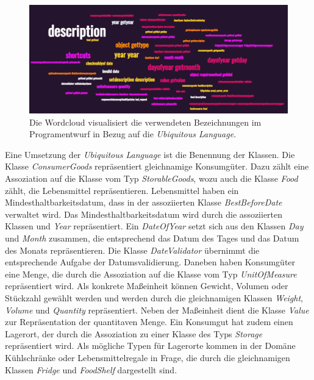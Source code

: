 \begin{figure}[H]
	\centering
	\includegraphics[width=1.0\textwidth]{Bilder/wordcloud.PNG}
	\caption[Wordcloud in Bezug zu Domain Driven Design.]{Die Wordcloud visualisiert die verwendeten Bezeichnungen im Programentwurf in Bezug auf die \textit{Ubiquitous Language}.}
	\label{fig:wordcloud}
\end{figure}

Eine Umsetzung der \textit{Ubiquitous Language} ist die Benennung der Klassen.
Die Klasse \textit{ConsumerGoods} repräsentiert gleichnamige Konsumgüter.
Dazu zählt eine Assoziation auf die Klasse vom Typ \textit{StorableGoods}, wozu auch die Klasse \textit{Food} zählt, die Lebensmittel repräsentieren.
Lebensmittel haben ein Mindesthaltbarkeitsdatum, dass in der assoziierten Klasse \textit{BestBeforeDate} verwaltet wird.
Das Mindesthaltbarkeitsdatum wird durch die assoziierten Klassen  und \textit{Year} repräsentiert.
Ein \textit{DateOfYear} setzt sich aus den Klassen \textit{Day} und \textit{Month} zusammen, die entsprechend das Datum des Tages und das Datum des Monats repräsentieren.
Die Klasse \textit{DateValidator} übernimmt die entsprechende Aufgabe der Datumsvalidierung.
Daneben haben Konsumgüter eine Menge, die durch die Assoziation auf die Klasse vom Typ \textit{UnitOfMeasure} repräsentiert wird.
Als konkrete Maßeinheit können Gewicht, Volumen oder Stückzahl gewählt werden und werden durch die gleichnamigen Klassen \textit{Weight}, \textit{Volume} und \textit{Quantity} repräsentiert.
Neben der Maßeinheit dient die Klasse \textit{Value} zur Repräsentation der quantitaven Menge.
Ein Konsumgut hat zudem einen Lagerort, der durch die Assoziation zu einer Klasse des Typs \textit{Storage} repräsentiert wird.
Als mögliche Typen für Lagerorte kommen in der Domäne Kühlschränke oder Lebensmittelregale in Frage, die durch die gleichnamigen Klassen \textit{Fridge} und \textit{FoodShelf} dargestellt sind.

